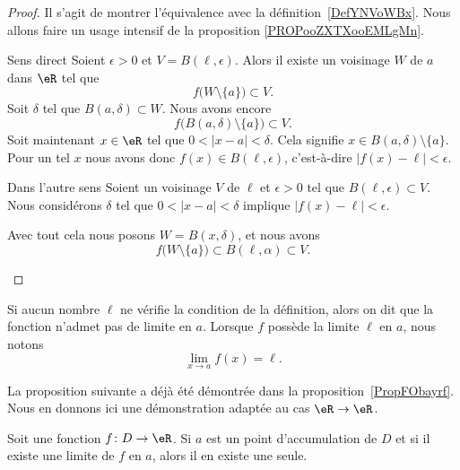 \begin{proof}
	Il s'agit de montrer l'équivalence avec la définition~\ref{DefYNVoWBx}. Nous allons faire un usage intensif de la proposition \ref{PROPooZXTXooEMLgMn}.
	\begin{subproof}
		\item[Sens direct]
		Soient \( \epsilon>0\) et \( V=B(\ell,\epsilon)\). Alors il existe un voisinage \( W\) de \( a\) dans \( \eR\) tel que
		\begin{equation}
			f\big( W\setminus\{ a \} \big)\subset V.
		\end{equation}
		Soit \( \delta\) tel que \( B(a,\delta)\subset W\). Nous avons encore
		\begin{equation}
			f\big( B(a,\delta)\setminus\{ a \} \big)\subset V.
		\end{equation}
		Soit maintenant \( x\in \eR\) tel que $0<| x-a |<\delta$. Cela signifie \( x\in B(a,\delta)\setminus\{ a \}\). Pour un tel \( x\) nous avons donc \( f(x)\in B(\ell,\epsilon)\), c'est-à-dire \( | f(x)-\ell |<\epsilon\).
		\item[Dans l'autre sens]
		Soient un voisinage \( V\) de \( \ell\) et \( \epsilon>0\) tel que \( B(\ell,\epsilon)\subset V\). Nous considérons \( \delta\) tel que \( 0<| x-a |<\delta\) implique \( | f(x)-\ell |<\epsilon\).

		Avec tout cela nous posons \( W=B(x,\delta)\), et nous avons
		\begin{equation}
			f\big( W\setminus\{ a \} \big)\subset B(\ell,\alpha)\subset V.
		\end{equation}
	\end{subproof}
\end{proof}

Si aucun nombre $\ell$ ne vérifie la condition de la définition, alors on dit que la fonction n'admet pas de limite en $a$. Lorsque $f$ possède la limite $\ell$ en $a$, nous notons
\begin{equation}
	\lim_{x\to a} f(x)=\ell.
\end{equation}

La proposition suivante a déjà été démontrée dans la proposition~\ref{PropFObayrf}. Nous en donnons ici une démonstration adaptée au cas \( \eR\to \eR\).

\begin{proposition}
	Soit une fonction $f\colon D\to \eR$. Si $a$ est un point d'accumulation de $D$ et si il existe une limite de $f$ en $a$, alors il en existe une seule.
\end{proposition}


